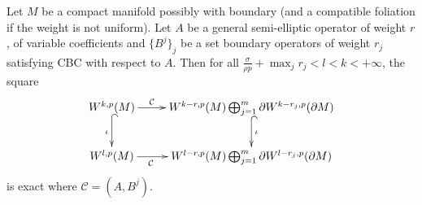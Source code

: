 \begin{theorem}
\label{thm:elliptic-general}
Let \(M\) be a compact manifold possibly with boundary (and a compatible foliation if
the weight is not uniform). Let \(A\) be a general semi-elliptic operator of weight \(r\), of variable coefficients and \(\{B^j\}_j\) be a set boundary operators of weight \(r_j\) satisfying
CBC with respect to \(A\). Then for all \(\frac{\sigma}{\rho p}+\max_j r_j < l<
k<+\infty\), the square
\[
 \xymatrix{
W^{k,p}(M) \ar@{->}[r]^<<<<<{\mathcal{C}} \ar@{^{(}->}[d]_{\iota} &
W^{k-r,p}(M)\bigoplus_{j=1}^m \partial W^{k-r_j,p}(\partial M) \ar@{^{(}->}[d]^{\iota} \\
W^{l,p}(M) \ar@{->}[r]_<<<<<{\mathcal{C}} & W^{l-r,p}(M)\bigoplus_{j=1}^m \partial
W^{l-r_j,p}(\partial M) 
}
\]
is exact where \(\mathcal{C}=(A,B^j)\).
\end{theorem}

